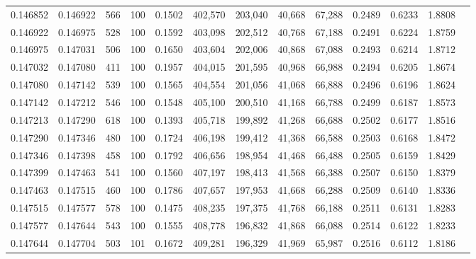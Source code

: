 \begin{tabular}{rrrrrrrrrrrrr}
0.146852 & 0.146922 &   566 & 100 &                                     0.1502 & 402,570 & 203,040 &  40,668 &  67,288 & 0.2489 & 0.6233 & 1.8808 \\
0.146922 & 0.146975 &   528 & 100 &                                     0.1592 & 403,098 & 202,512 &  40,768 &  67,188 & 0.2491 & 0.6224 & 1.8759 \\
0.146975 & 0.147031 &   506 & 100 &                                     0.1650 & 403,604 & 202,006 &  40,868 &  67,088 & 0.2493 & 0.6214 & 1.8712 \\
0.147032 & 0.147080 &   411 & 100 &                                     0.1957 & 404,015 & 201,595 &  40,968 &  66,988 & 0.2494 & 0.6205 & 1.8674 \\
0.147080 & 0.147142 &   539 & 100 &                                     0.1565 & 404,554 & 201,056 &  41,068 &  66,888 & 0.2496 & 0.6196 & 1.8624 \\
0.147142 & 0.147212 &   546 & 100 &                                     0.1548 & 405,100 & 200,510 &  41,168 &  66,788 & 0.2499 & 0.6187 & 1.8573 \\
0.147213 & 0.147290 &   618 & 100 &                                     0.1393 & 405,718 & 199,892 &  41,268 &  66,688 & 0.2502 & 0.6177 & 1.8516 \\
0.147290 & 0.147346 &   480 & 100 &                                     0.1724 & 406,198 & 199,412 &  41,368 &  66,588 & 0.2503 & 0.6168 & 1.8472 \\
0.147346 & 0.147398 &   458 & 100 &                                     0.1792 & 406,656 & 198,954 &  41,468 &  66,488 & 0.2505 & 0.6159 & 1.8429 \\
0.147399 & 0.147463 &   541 & 100 &                                     0.1560 & 407,197 & 198,413 &  41,568 &  66,388 & 0.2507 & 0.6150 & 1.8379 \\
0.147463 & 0.147515 &   460 & 100 &                                     0.1786 & 407,657 & 197,953 &  41,668 &  66,288 & 0.2509 & 0.6140 & 1.8336 \\
0.147515 & 0.147577 &   578 & 100 &                                     0.1475 & 408,235 & 197,375 &  41,768 &  66,188 & 0.2511 & 0.6131 & 1.8283 \\
0.147577 & 0.147644 &   543 & 100 &                                     0.1555 & 408,778 & 196,832 &  41,868 &  66,088 & 0.2514 & 0.6122 & 1.8233 \\
0.147644 & 0.147704 &   503 & 101 &                                     0.1672 & 409,281 & 196,329 &  41,969 &  65,987 & 0.2516 & 0.6112 & 1.8186 \\

\end{tabular}
